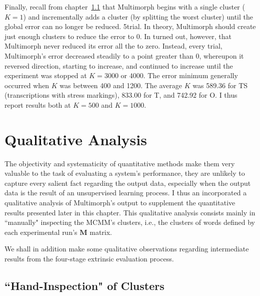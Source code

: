 Finally, recall from  chapter~\ref{}  that Multimorph begins with a single cluster ($K = 1$) 
and incrementally adds a cluster (by splitting the worst cluster) until the global error can no longer be reduced. %
5trial. 
In theory, Multimorph should create just enough clusters to reduce the error
to 0. In turned out, however, that Multimorph never reduced its error all the to zero. Instead,
every trial, Multimorph's error decreased steadily to a point greater than 0, whereupon it reversed direction, starting to 
increase, and continued to increase until the experiment was stopped at $K = 3000$ or $4000$.  The error minimum generally occurred when $K$ was between 400 and 1200. 
The average $K$ was 589.36 for TS (transcriptions with stress markings), 833.00 for T, and 742.92 for O. I thus 
report results both at $K = 500$ and $K = 1000$.

\section{Qualitative Analysis}
The objectivity and systematicity of quantitative methods make them very valuable
to the task of evaluating a system's performance,  %
	they are unlikely to capture every salient fact regarding the 
	output data, especially when the output data is the result of an unsupervised learning process. 
	I thus an incorporated a qualitative analysis of Multimorph's output to supplement the
	 quantitative results presented later in this chapter.
	This qualitative analysis consists mainly in ``manually" inspecting the MCMM's clusters,
	 i.e., the clusters of words defined by each experimental run's $\mathbf{M}$ matrix.
	
	We shall in addition make some qualitative observations regarding intermediate results from the four-stage extrinsic evaluation process.
\subsection{``Hand-Inspection" of Clusters}


